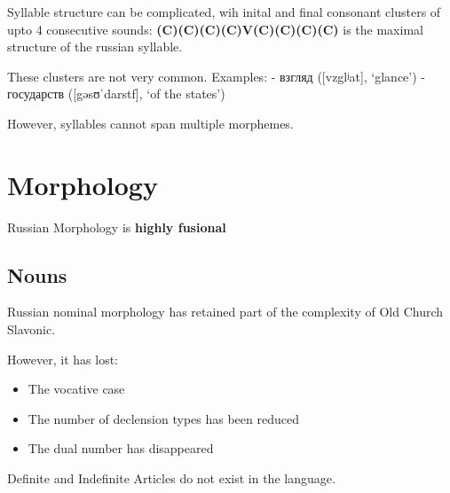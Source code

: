 \documentclass[
  a4paperpaper,
]{report}
\providecommand{\tightlist}{%
  \setlength{\itemsep}{0pt}\setlength{\parskip}{0pt}}
\begin{document}
Syllable structure can be complicated, wih inital and final consonant
clusters of upto 4 consecutive sounds:
\textbf{(C)(C)(C)(C)V(C)(C)(C)(C)} is the maximal structure of the
russian syllable.

These clusters are not very common. Examples: - взгляд ({[}vzglʲat{]},
`glance') - государств ({[}gəsʊˈdarstf{]}, `of the states')

However, syllables cannot span multiple morphemes.

\hypertarget{morphology}{%
\chapter{Morphology}\label{morphology}}

Russian Morphology is \textbf{highly fusional}

\hypertarget{nouns}{%
\section{Nouns}\label{nouns}}

Russian nominal morphology has retained part of the complexity of Old
Church Slavonic.

However, it has lost:

\begin{itemize}
\tightlist
\item
  The vocative case
\item
  The number of declension types has been reduced
\item
  The dual number has disappeared
\end{itemize}

Definite and Indefinite Articles do not exist in the language.
\end{document}
